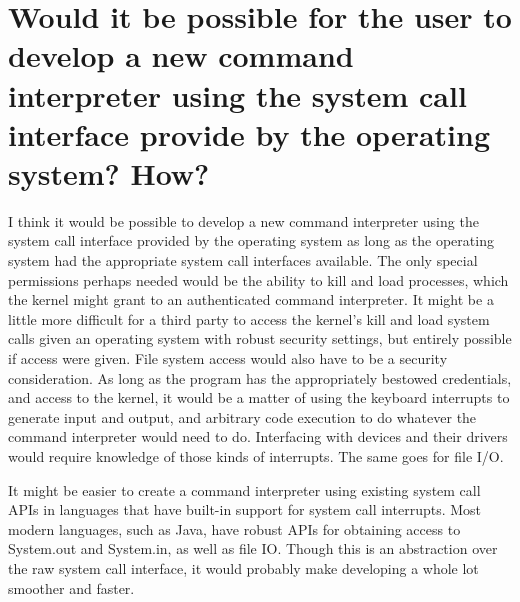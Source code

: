 \documentclass{article}
\begin{document}
\section{Would it be possible for the user to develop a new command interpreter using the system call interface provide by the operating system? How?}

I think it would be possible to develop a new command interpreter using the system call interface provided by the operating system as long as the operating system had the appropriate system call interfaces available. The only special permissions perhaps needed would be the ability to kill and load processes, which the kernel might grant to an authenticated command interpreter. It might be a little more difficult for a third party to access the kernel's kill and load system calls given an operating system with robust security settings, but entirely possible if access were given. File system access would also have to be a security consideration. As long as the program has the appropriately bestowed credentials, and access to the kernel, it would be a matter of using the keyboard interrupts to generate input and output, and arbitrary code execution to do whatever the command interpreter would need to do. Interfacing with devices and their drivers would require knowledge of those kinds of interrupts. The same goes for file I/O.

It might be easier to create a command interpreter using existing system call APIs in languages that have built-in support for system call interrupts. Most modern languages, such as Java, have robust APIs for obtaining access to System.out and System.in, as well as file IO. Though this is an abstraction over the raw system call interface, it would probably make developing a whole lot smoother and faster.
\end{document}
